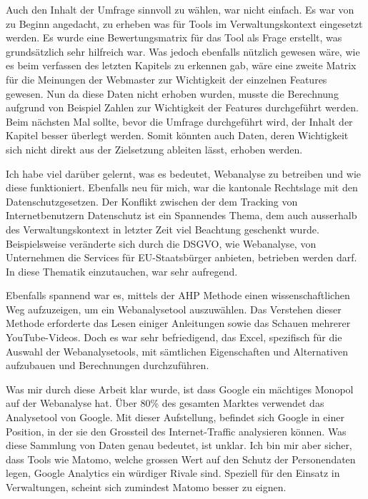 Auch den Inhalt der Umfrage sinnvoll zu wählen, war nicht einfach. Es war von zu Beginn angedacht, zu erheben was für Tools im Verwaltungskontext eingesetzt werden. Es wurde eine Bewertungsmatrix für das Tool als Frage erstellt, was grundsätzlich sehr hilfreich war. Was jedoch ebenfalls nützlich gewesen wäre, wie es beim verfassen des letzten Kapitels zu erkennen gab, wäre eine zweite Matrix für die Meinungen der Webmaster zur Wichtigkeit der einzelnen Features gewesen. Nun da diese Daten nicht erhoben wurden, musste die Berechnung aufgrund von Beispiel Zahlen zur Wichtigkeit der Features durchgeführt werden. Beim nächsten Mal sollte, bevor die Umfrage durchgeführt wird, der Inhalt der Kapitel besser überlegt werden. Somit könnten auch Daten, deren Wichtigkeit sich nicht direkt aus der Zielsetzung ableiten lässt, erhoben werden.

Ich habe viel darüber gelernt, was es bedeutet, Webanalyse zu betreiben und wie diese funktioniert. Ebenfalls neu für mich, war die kantonale Rechtslage mit den Datenschutzgesetzen. Der Konflikt zwischen der dem Tracking von Internetbenutzern Datenschutz ist ein Spannendes Thema, dem auch ausserhalb des Verwaltungskontext in letzter Zeit viel Beachtung geschenkt wurde. Beispielsweise veränderte sich durch die DSGVO, wie Webanalyse, von Unternehmen die Services für EU-Staatsbürger anbieten, betrieben werden darf. In diese Thematik einzutauchen, war sehr aufregend. 

Ebenfalls spannend war es, mittels der AHP Methode einen wissenschaftlichen Weg aufzuzeigen, um ein Webanalysetool auszuwählen. Das Verstehen dieser Methode erforderte das Lesen einiger Anleitungen sowie das Schauen mehrerer YouTube-Videos. Doch es war sehr befriedigend, das Excel, spezifisch für die Auswahl der Webanalysetools, mit sämtlichen Eigenschaften und Alternativen aufzubauen und Berechnungen durchzuführen.

Was mir durch diese Arbeit klar wurde, ist dass Google ein mächtiges Monopol auf der Webanalyse hat. Über 80\% des gesamten Marktes verwendet das Analysetool von Google. Mit dieser Aufstellung, befindet sich Google in einer Position, in der sie den Grossteil des Internet-Traffic analysieren können. Was diese Sammlung von Daten genau bedeutet, ist unklar. Ich bin mir aber sicher, dass Tools wie Matomo, welche grossen Wert auf den Schutz der Personendaten legen, Google Analytics ein würdiger Rivale sind. Speziell für den Einsatz in Verwaltungen, scheint sich zumindest Matomo besser zu eignen.


